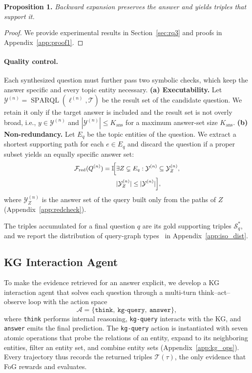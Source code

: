 \noindent\textbf{Proposition 1.} \textit{Backward expansion preserves the answer and yields triples that support it.}\vspace{-2mm}
\begin{proof}\renewcommand{\qedsymbol}{}
We provide experimental results in Section~\ref{sec:rq3} and proofs in Appendix~\ref{app:proof1}.
\end{proof}

\paragraph{Quality control.}
Each synthesized question must further pass two symbolic checks, which keep the answer specific and every topic entity necessary.
\textbf{(a) Executability.} Let $\mathcal{Y}^{(n)} = \operatorname{SPARQL}(\ell^{(n)}, \mathcal{T})$ be the result set of the candidate question. We retain it only if the target answer is included and the result set is not overly broad, i.e., $y\in\mathcal{Y}^{(n)}$ and $|\mathcal{Y}^{(n)}|\le K_{\text{ans}}$ for a maximum answer-set size $K_{\text{ans}}$.
\textbf{(b) Non-redundancy.} Let $E_q$ be the topic entities of the question. We extract a shortest supporting path for each $e\in E_q$ and discard the question if a proper subset yields an equally specific answer set:
\begin{equation}
\small
\begin{aligned}
\mathcal{F}_{\mathrm{red}}(Q^{(n)})
= \mathbb{I}\!\Big[
&\exists Z \subsetneq E_q:
\mathcal{Y}^{(n)} \subseteq \mathcal{Y}^{(n)}_{Z}, \\
&|\mathcal{Y}^{(n)}_{Z}| \le |\mathcal{Y}^{(n)}|
\Big],
\end{aligned}
\end{equation}
where $\mathcal{Y}^{(n)}_{Z}$ is the answer set of the query built only from the paths of $Z$ (Appendix~\ref{app:redcheck}).

The triples accumulated for a final question $q$ are its gold supporting triples $\mathcal{S}^{*}_{q}$, and we report the distribution of query-graph types~\citep{GrailQA++} in Appendix~\ref{app:iso_dist}.

\subsection{KG Interaction Agent}
\label{sec:agent}

To make the evidence retrieved for an answer explicit, we develop a KG interaction agent that solves each question through a multi-turn think--act--observe loop with the action space
\begin{equation}
    \mathcal{A}
    =
    \{\texttt{think},\ \texttt{kg-query},\ \texttt{answer}\},
\end{equation}
where \texttt{think} performs internal reasoning, \texttt{kg-query} interacts with the KG, and \texttt{answer} emits the final prediction. The \texttt{kg-query} action is instantiated with seven atomic operations that probe the relations of an entity, expand to its neighboring entities, filter an entity set, and combine entity sets (Appendix~\ref{app:kg_ops}). Every trajectory thus records the returned triples $\mathcal{T}(\tau)$, the only evidence that FoG rewards and evaluates.

